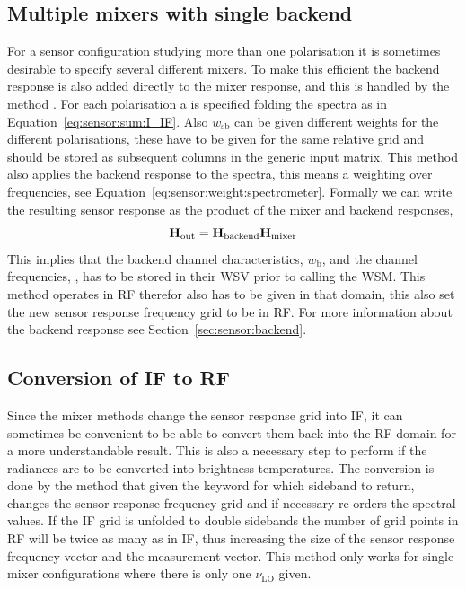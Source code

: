 \subsection{Multiple mixers with single backend}
For a sensor configuration studying more than one polarisation it is sometimes desirable to specify several different mixers. To make this efficient the backend response is also added directly to the mixer response, and this is handled by the method . For each polarisation a  is specified folding the spectra as in Equation~\ref{eq:sensor:sum:I_IF}. Also $w_\mathrm{sb}$ can be given different weights for the different polarisations, these have to be given for the same relative grid and should be stored as subsequent columns in the generic input matrix.
This method also applies the backend response to the spectra, this means a weighting over frequencies, see Equation~\ref{eq:sensor:weight:spectrometer}. Formally we can write the resulting sensor response as the product of the mixer and backend responses,
\begin{equation}
\mathbf{H}_{\mathrm{out}} = \mathbf{H}_{\mathrm{backend}} \mathbf{H}_{\mathrm{mixer}}
\end{equation}
This implies that the backend channel characteristics, $w_\mathrm{b}$, and the channel frequencies, , has to be stored in their WSV prior to calling the WSM. This method operates in RF therefor  also has to be given in that domain, this also set the new sensor response frequency grid to be in RF. For more information about the backend response see Section~\ref{sec:sensor:backend}.

\subsection{Conversion of IF to RF}
Since the mixer methods change the sensor response grid into IF, it can sometimes be convenient to be able to convert them back into the RF domain for a more understandable result. This is also a necessary step to perform if the radiances are to be converted into brightness temperatures. The conversion is done by the method  that given the keyword for which sideband to return, changes the sensor response frequency grid and if necessary re-orders the spectral values. If the IF grid is unfolded to double sidebands the number of grid points in RF will be twice as many as in IF, thus increasing the size of the sensor response frequency vector and the measurement vector. This method only works for single mixer configurations where there is only one $\nu_\mathrm{LO}$ given.


